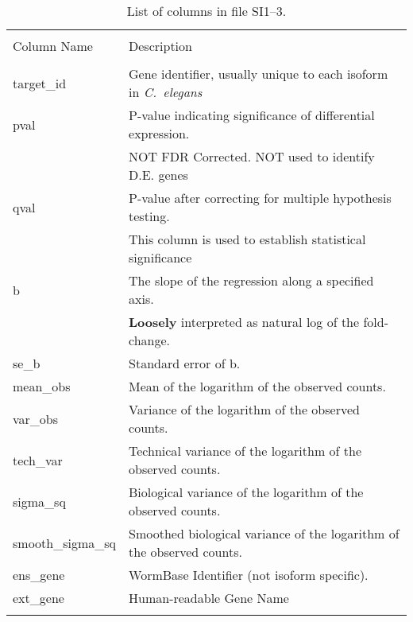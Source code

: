 \documentclass{article}
\newcommand{\ra}[1]{\renewcommand{\arraystretch}{#1}}
\newcommand{\cel}{\emph{C.~elegans}}
\begin{document}
\begin{table*}
  \centering{}
  \ra{1.3}
   \begin{tabular}{@{}ll@{}}
   \toprule{}\\
   Column Name & Description\\
  \toprule{}\\
   target\_id & Gene identifier, usually unique to each isoform in \cel{}\\
   pval & P-value indicating significance of differential expression.\\
    & NOT FDR Corrected. NOT used to identify D.E. genes\\
   qval & P-value after correcting for multiple hypothesis testing.\\
    & This column is used to establish statistical significance\\
   b & The slope of the regression along a specified axis.\\
    & \textbf{Loosely} interpreted as natural log of the fold-change.\\
    se\_b & Standard error of b.\\
    mean\_obs & Mean of the logarithm of the observed counts.\\
    var\_obs & Variance of the logarithm of the observed counts.\\
    tech\_var & Technical variance of the logarithm of the observed counts.\\
    sigma\_sq & Biological variance of the logarithm of the observed counts.\\
    smooth\_sigma\_sq & Smoothed biological variance of the logarithm of the observed counts.\\
    ens\_gene & WormBase Identifier (not isoform specific).\\
    ext\_gene & Human-readable Gene Name\\
   \bottomrule{}
 \end{tabular}
\caption{List of columns in file SI1--3.}
\label{tab:sleuth_columns}
\end{table*}
\end{document}
